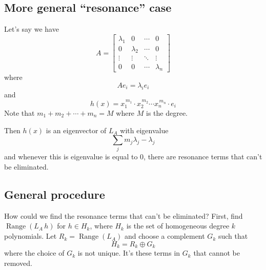 \documentclass{article}
\begin{document}
\subsection{More general ``resonance'' case}

Let's say we have 
\[
A=\begin{bmatrix}
    \lambda_1 & 0 & \cdots & 0 \\
    0 & \lambda_2 & \cdots & 0 \\
    \vdots & \vdots & \ddots & \vdots \\
    0 & 0 & \cdots & \lambda_n
\end{bmatrix}
\]
where
\[
Ae_i=\lambda_i e_i
\]
and 
\[
h(x)=x_1^{\, m_1}\cdot x_2^{\, m_2} \cdots x_n^{\, m_n}\cdot e_i
\]
Note that $m_1+m_2+\cdots+m_n=M$ where $M$ is the degree.

Then $h(x)$ is an eigenvector of $L_A$ with eigenvalue 
\[
\sum_j m_j\lambda_j-\lambda_j
\]
and whenever this is eigenvalue is equal to $0$, there are resonance terms that can't be eliminated.

\subsection{General procedure}

How could we find the resonance terms that can't be eliminated? First, find $\operatorname{Range}\left(L_A\, h\right)$ for $h\in H_k$, where $H_k$ is the set of homogeneous degree $k$ polynomials. Let $R_k=\operatorname{Range}\left(L_A\right)$ and choose a complement $G_k$ such that 
\[
H_k=R_k\oplus G_k
\]
where the choice of $G_k$ is not unique. It's these terms in $G_k$ that cannot be removed.
\end{document}
